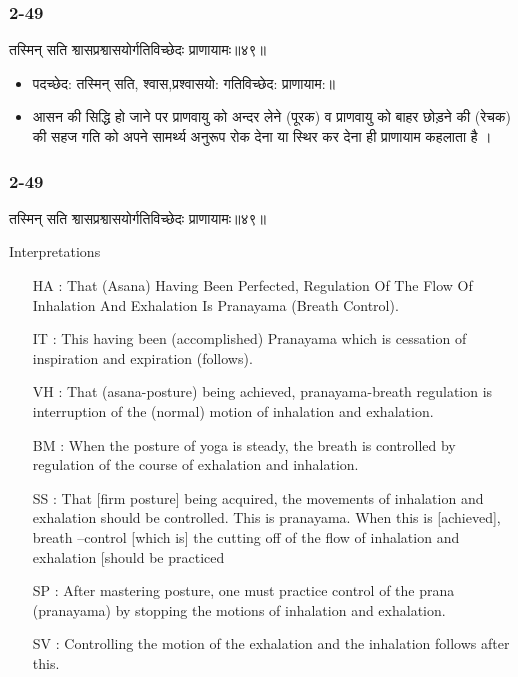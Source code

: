 \begin{frame}[fragile]\frametitle{2-49}
\begin{sanskrit}
तस्मिन् सति श्वासप्रश्वासयोर्गतिविच्छेदः प्राणायामः॥४९॥
\end{sanskrit}

\begin{itemize}
\item पदच्छेद: तस्मिन् सति, श्वास,प्रश्वासयो: गतिविच्छेद: प्राणायाम:॥
\item आसन की सिद्धि हो जाने पर प्राणवायु को अन्दर लेने (पूरक) व प्राणवायु को बाहर छोड़ने की (रेचक) की सहज गति को अपने सामर्थ्य अनुरूप रोक देना या स्थिर कर देना ही प्राणायाम कहलाता है ।
\end{itemize}	
\end{frame}



\begin{frame}[fragile]\frametitle{2-49}
\begin{sanskrit}
तस्मिन् सति श्वासप्रश्वासयोर्गतिविच्छेदः प्राणायामः॥४९॥
\end{sanskrit}

Interpretations
\begin{itemize}
\item [HA]: That (Asana) Having Been Perfected, Regulation Of The Flow Of Inhalation And Exhalation Is Pranayama (Breath Control).
\item [IT]: This having been (accomplished) Pranayama which is cessation of inspiration and expiration (follows).
\item [VH]: That (asana-posture) being achieved, pranayama-breath regulation is interruption of the (normal) motion of inhalation and exhalation.
\item [BM]: When the posture of yoga is steady, the breath is controlled by regulation of the course of exhalation and inhalation.
\item [SS]: That [firm posture] being acquired, the movements of inhalation and exhalation should be controlled. This is pranayama. When this is [achieved], breath –control [which is] the cutting off of the flow of inhalation and exhalation [should be practiced
\item [SP]: After mastering posture, one must practice control of the prana (pranayama) by stopping the motions of inhalation and exhalation.
\item [SV]: Controlling the motion of the exhalation and the inhalation follows after this. 
\end{itemize}
\end{frame}

